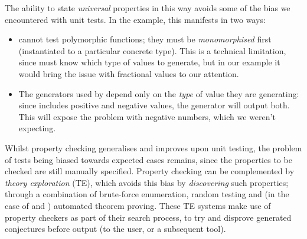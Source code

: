 The ability to state \emph{universal} properties in this way avoids some of the
bias we encountered with unit tests. In the  example, this
manifests in two ways:

\begin{itemize}
\item \qcheck{} cannot test polymorphic functions; they must be
  \emph{monomorphised} first (instantiated to a particular concrete type). This
  is a technical limitation, since \qcheck{} must know which type of values to
  generate, but in our example it would bring the issue with fractional values
  to our attention.

\item The generators used by \qcheck{} depend only on the \emph{type} of value
  they are generating: since  includes positive and negative values, the
   generator will output both. This will expose the problem with
  negative numbers, which we weren't expecting.
\end{itemize}

Whilst property checking generalises and improves upon unit testing, the problem
of tests being biased towards expected cases remains, since the properties to be
checked are still manually specified. Property checking can be complemented by
\emph{theory exploration} (TE), which avoids this bias by \emph{discovering}
such properties; through a combination of brute-force enumeration, random
testing and (in the case of \hspec{} and \hipster{}) automated theorem proving.
These TE systems make use of property checkers as part of their search process,
to try and disprove generated conjectures before output (to the user, or a
subsequent tool).
